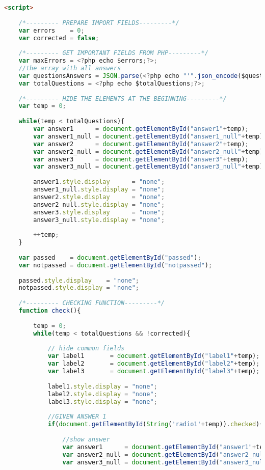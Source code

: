 \begin{lstlisting}[language=html]
	<script>
	
	/*--------- PREPARE IMPORT FIELDS---------*/
	var errors    = 0;
	var corrected = false;
	
	/*--------- GET IMPORTANT FIELDS FROM PHP---------*/
	var maxErrors = <?php echo $errors;?>;
	//the array with all answers
	var questionsAnswers = JSON.parse(<?php echo "'".json_encode($questionsAnswers)."'"; ?>);
	var totalQuestions = <?php echo $totalQuestions;?>;
	
	/*--------- HIDE THE ELEMENTS AT THE BEGINNING---------*/
	var temp = 0;
	
	while(temp < totalQuestions){
		var answer1      = document.getElementById("answer1"+temp);
		var answer1_null = document.getElementById("answer1_null"+temp);
		var answer2      = document.getElementById("answer2"+temp);
		var answer2_null = document.getElementById("answer2_null"+temp);
		var answer3      = document.getElementById("answer3"+temp);
		var answer3_null = document.getElementById("answer3_null"+temp);
		
		answer1.style.display      = "none";
		answer1_null.style.display = "none";
		answer2.style.display      = "none";
		answer2_null.style.display = "none";
		answer3.style.display      = "none";
		answer3_null.style.display = "none";
		
		++temp;
	}
	
	var passed    = document.getElementById("passed");
	var notpassed = document.getElementById("notpassed");
	
	passed.style.display    = "none";
	notpassed.style.display = "none";
	
	/*--------- CHECKING FUNCTION---------*/
	function check(){
		
		temp = 0;
		while(temp < totalQuestions && !corrected){
			
			// hide common fields
			var label1       = document.getElementById("label1"+temp);
			var label2       = document.getElementById("label2"+temp);
			var label3       = document.getElementById("label3"+temp);
			
			label1.style.display = "none";
			label2.style.display = "none";
			label3.style.display = "none";
			
			//GIVEN ANSWER 1
			if(document.getElementById(String('radio1'+temp)).checked){
				
				//show answer
				var answer1      = document.getElementById("answer1"+temp);
				var answer2_null = document.getElementById("answer2_null"+temp);
				var answer3_null = document.getElementById("answer3_null"+temp);
				

\end{lstlisting}
